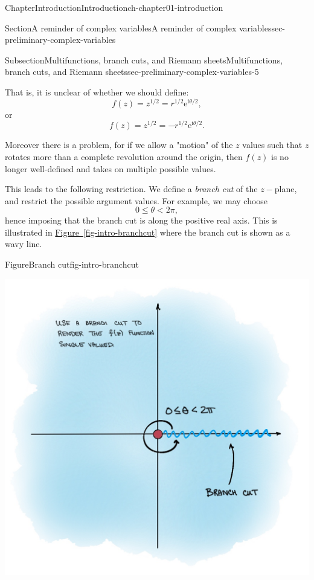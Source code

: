 \documentclass[oneside,10pt,]{book}
\newcommand{\xreffont}{\relax}
\numberwithin{equation}{section}
\newcommand{\e}{\mathrm{e}}
\newcommand{\im}{\mathrm{i}}
\begin{document}
\begin{chapterptx}{Chapter}{Introduction}{}{Introduction}{}{}{ch-chapter01-introduction}
\begin{sectionptx}{Section}{A reminder of complex variables}{}{A reminder of complex variables}{}{}{sec-preliminary-complex-variables}
\begin{subsectionptx}{Subsection}{Multifunctions, branch cuts, and Riemann sheets}{}{Multifunctions, branch cuts, and Riemann sheets}{}{}{sec-preliminary-complex-variables-5}
\par
That is, it is unclear of whether we should define:%
\begin{equation*}
f(z) = z^{1/2} = r^{1/2} \e^{\im\theta/2},
\end{equation*}
or%
\begin{equation*}
f(z) = z^{1/2} = -r^{1/2} \e^{\im\theta/2}.
\end{equation*}
%
\par
Moreover there is a problem, for if we allow a "motion" of the \(z\) values such that \(z\) rotates more than a complete revolution around the origin, then \(f(z)\) is no longer well-defined and takes on multiple possible values.%
\par
This leads to the following restriction. We define a \emph{branch cut} of the \(z-\)plane, and restrict the possible argument values. For example, we may choose%
\begin{equation*}
0 \leq \theta < 2\pi,
\end{equation*}
hence imposing that the branch cut is along the positive real axis. This is illustrated in \hyperref[fig-intro-branchcut]{Figure~{\xreffont\ref{fig-intro-branchcut}}} where the branch cut is shown as a wavy line.%
\begin{figureptx}{Figure}{Branch cut}{fig-intro-branchcut}{}%
\begin{image}{0.1}{0.8}{0.1}{}%
\includegraphics[width=\linewidth]{external/intro_branchcut.jpg}

\end{image}
\end{figureptx}
\end{subsectionptx}
\end{sectionptx}
\end{chapterptx}
\end{document}
